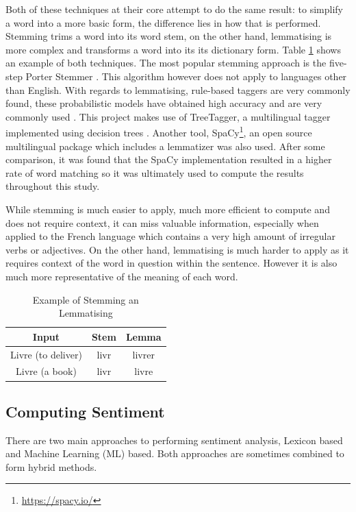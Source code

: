 Both of these techniques at their core attempt to do the same result: to simplify a word into a more basic form, the difference lies in how that is performed. Stemming trims a word into its word stem, on the other hand, lemmatising is more complex and transforms a word into its its dictionary form. Table \ref{tab:stem and lemma} shows an example of both techniques. The most popular stemming approach is the five-step Porter Stemmer \citep{porter1980algorithm}. This algorithm however does not apply to languages other than English. With regards to lemmatising, rule-based taggers are very commonly found, these probabilistic models have obtained high accuracy and are very commonly used \citep{brill1992simple}. This project makes use of TreeTagger, a multilingual tagger implemented using decision trees \citep{schmid2013probabilistic}. Another tool, SpaCy\footnote{\url{https://spacy.io/}}, an open source multilingual package which includes a lemmatizer was also used. After some comparison, it was found that the SpaCy implementation resulted in a higher rate of word matching so it was ultimately used to compute the results throughout this study.

While stemming is much easier to apply, much more efficient to compute and does not require context, it can miss valuable information, especially when applied to the French language which contains a very high amount of irregular verbs or adjectives. On the other hand, lemmatising is much harder to apply as it requires context of the word in question within the sentence. However it is also much more representative of the meaning of each word. 

\begin{table}[htb]
\caption{Example of Stemming an Lemmatising}
\label{tab:stem and lemma}
\centering
\begin{tabular}{@{}|ccc|@{}}
\toprule
\textbf{Input} & \textbf{Stem} & \textbf{Lemma} \\ \midrule
Livre (to deliver) & livr & livrer \\
Livre (a book) & livr & livre \\ \bottomrule
\end{tabular}
\end{table}

\subsection{Computing Sentiment}

There are two main approaches to performing sentiment analysis, Lexicon based and Machine Learning (ML) based. Both approaches are sometimes combined to form hybrid methods.

